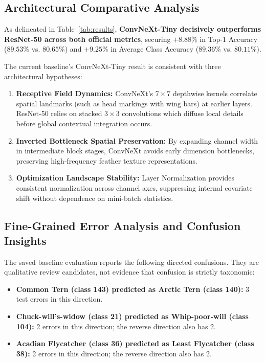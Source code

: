 \documentclass[10pt,twocolumn,letterpaper]{article}
\begin{document}
\subsection{Architectural Comparative Analysis}
As delineated in Table~\ref{tab:results}, \textbf{ConvNeXt-Tiny decisively outperforms ResNet-50 across both official metrics}, securing $+8.88\%$ in Top-1 Accuracy ($89.53\%$ vs. $80.65\%$) and $+9.25\%$ in Average Class Accuracy ($89.36\%$ vs. $80.11\%$).

The current baseline's ConvNeXt-Tiny result is consistent with three architectural hypotheses:
\begin{enumerate}
    \item \textbf{Receptive Field Dynamics:} ConvNeXt's $7\times7$ depthwise kernels correlate spatial landmarks (such as head markings with wing bars) at earlier layers. ResNet-50 relies on stacked $3\times3$ convolutions which diffuse local details before global contextual integration occurs.
    \item \textbf{Inverted Bottleneck Spatial Preservation:} By expanding channel width in intermediate block stages, ConvNeXt avoids early dimension bottlenecks, preserving high-frequency feather texture representations.
    \item \textbf{Optimization Landscape Stability:} Layer Normalization provides consistent normalization across channel axes, suppressing internal covariate shift without dependence on mini-batch statistics.
\end{enumerate}

\subsection{Fine-Grained Error Analysis and Confusion Insights}
The saved baseline evaluation reports the following directed confusions. They are qualitative review candidates, not evidence that confusion is strictly taxonomic:
\begin{itemize}
    \item \textbf{Common Tern (class 143) predicted as Arctic Tern (class 140):} 3 test errors in this direction.
    \item \textbf{Chuck-will's-widow (class 21) predicted as Whip-poor-will (class 104):} 2 errors in this direction; the reverse direction also has 2.
    \item \textbf{Acadian Flycatcher (class 36) predicted as Least Flycatcher (class 38):} 2 errors in this direction; the reverse direction also has 2.
\end{itemize}
\end{document}
